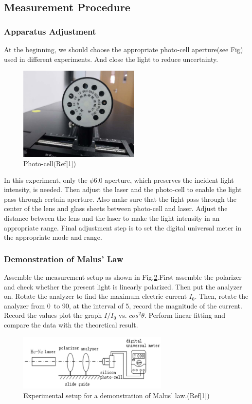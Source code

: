 \documentclass[12pt,a4paper]{article}
\begin{document}
\subsection{Measurement Procedure}
\subsubsection{Apparatus Adjustment}
At the beginning, we should choose the appropriate photo-cell aperture(see Fig) used in different experiments. And close the light to reduce uncertainty.
\begin{figure}[H]
    \centering
    \includegraphics[width=6cm]{photocell.jpg}
    \caption{Photo-cell(Ref[1])}
    \label{photocell}
\end{figure}
In this experiment, only the $\phi$6.0 aperture, which preserves the incident light intensity, is needed. Then adjust the laser and the photo-cell to enable the light pass through certain aperture. Also make sure that the light pass through the center of the lens and glass sheets between photo-cell and laser. Adjust the distance between the lens and the laser to make the light intensity in an appropriate range. Final adjustment step is to set the digital universal meter in the appropriate mode and range.

\subsubsection{Demonstration of Malus' Law}
Assemble the measurement setup as shown in Fig.\ref{apparatus}.First assemble the polarizer and check whether the present light is linearly polarized. Then put the analyzer on. Rotate the analyzer to find the maximum electric current $I_0$. Then, rotate the analyzer from 0\degree~to 90\degree, at the interval of 5\degree, record the magnitude of the current. Record the values plot the graph $I/I_0$ vs. $cos^2\theta$. Perform linear fitting and compare the data with the theoretical result.

\begin{figure}[H]
    \centering
    \includegraphics[width=7.5cm]{apparatus.jpg}
    \caption{Experimental setup for a demonstration of Malus' law.(Ref[1])}
    \label{apparatus}
\end{figure}
\end{document}
